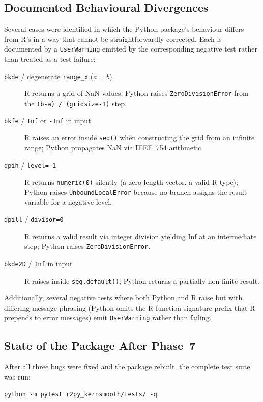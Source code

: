 \documentclass[12pt,a4paper]{article}
\begin{document}
\subsection{Documented Behavioural Divergences}

Several cases were identified in which the Python package's behaviour differs from R's in a way that cannot be straightforwardly corrected. Each is documented by a \texttt{UserWarning} emitted by the corresponding negative test rather than treated as a test failure:

\begin{description}
  \item[\texttt{bkde} / degenerate \texttt{range\_x} ($a = b$)]
    R returns a grid of NaN values; Python raises \texttt{ZeroDivisionError} from the \texttt{(b-a) / (gridsize-1)} step.
  \item[\texttt{bkfe} / \texttt{Inf} or \texttt{-Inf} in input]
    R raises an error inside \texttt{seq()} when constructing the grid from an infinite range; Python propagates NaN via IEEE~754 arithmetic.
  \item[\texttt{dpih} / \texttt{level=-1}]
    R returns \texttt{numeric(0)} silently (a zero-length vector, a valid R type); Python raises \texttt{UnboundLocalError} because no branch assigns the result variable for a negative level.
  \item[\texttt{dpill} / \texttt{divisor=0}]
    R returns a valid result via integer division yielding Inf at an intermediate step; Python raises \texttt{ZeroDivisionError}.
  \item[\texttt{bkde2D} / \texttt{Inf} in input]
    R raises inside \texttt{seq.default()}; Python returns a partially non-finite result.
\end{description}

Additionally, several negative tests where both Python and R raise but with differing message phrasing (Python omits the R function-signature prefix that R prepends to error messages) emit \texttt{UserWarning} rather than failing.

\subsection{State of the Package After Phase~7}

After all three bugs were fixed and the package rebuilt, the complete test suite was run:

\begin{lstlisting}[style=shell]
python -m pytest r2py_kernsmooth/tests/ -q
\end{lstlisting}
\end{document}

